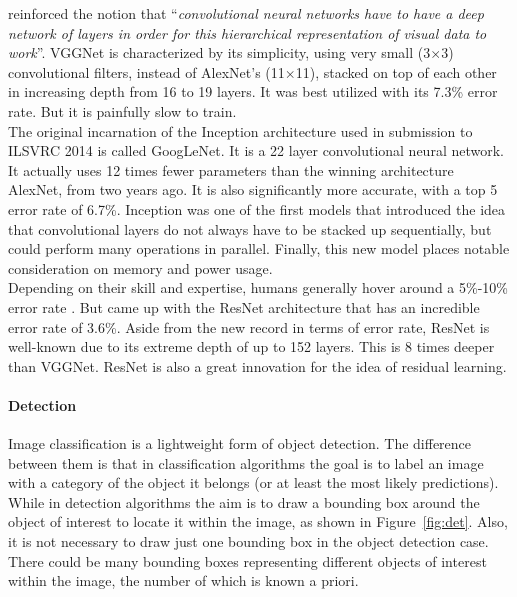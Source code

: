 \documentclass[12pt,a4paper,table,dvipsnames,tikz]{report}
\newcommand{\defn}[1]{\enquote{\textit{#1}}}
\newcommand{\acronym}{\MakeUppercase}
\newcommand{\bl}[1]{{\hypersetup{linkcolor=blue}#1}}
\begin{document}
	\citet{Simonyan_vgg} reinforced the notion that \defn{convolutional neural networks 
	have to have a deep network of layers in order for this hierarchical representation 
	of visual data to work}. VGGNet is characterized by its simplicity, using very small 
	(3$\times$3) convolutional filters, instead of AlexNet’s (11$\times$11), stacked on 
	top of each other in increasing depth from 16 to 19 layers. It was best utilized with 
	its 7.3\% error rate. But it is painfully slow to train.
	\\
	
	The original incarnation of the Inception architecture used in \citet{Szegedy_inception} 
	submission to \acronym{ilsvrc} 2014 is called GoogLeNet. It is a 22 layer convolutional 
	neural network. It actually uses 12 times fewer parameters than the winning architecture 
	AlexNet, from two years ago. It is also significantly more accurate, with a top 
	5 error rate of 6.7\%. Inception was one of the first models that introduced the 
	idea that convolutional layers do not always have to be stacked up sequentially, 
	but could perform many operations in parallel. Finally, this new model places notable 
	consideration on memory and power usage.
	\\
	
	Depending on their skill and expertise, humans generally hover around a 5\%-10\% 
	error rate \citep{Deshpande}. But \citet{He_resnet} came up with the ResNet 
	architecture that has an incredible error rate of 3.6\%. Aside from the new record 
	in terms of error rate, ResNet is well-known due to its extreme depth of up to 152 
	layers. This is 8 times deeper than VGGNet. ResNet is also a great innovation for 
	the idea of residual learning.
	\\
	
	\paragraph{Detection}
	\label{sec:bg:data:neural:models:d}
	
	Image classification is a lightweight form of object detection. The difference between 
	them is that in classification algorithms the goal is to label an image with a category 
	of the object it belongs (or at least the most likely predictions). While in detection 
	algorithms the aim is to draw a bounding box around the object of interest to locate it 
	within the image, as shown in Figure~\bl{\ref{fig:det}}. Also, it is not necessary to draw 
	just one bounding box in the object detection case. There could be many bounding boxes 
	representing different objects of interest within the image, the number of which is 
	known a priori.
	\\
	
\end{document}

